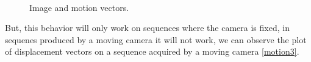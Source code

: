 \documentclass[12pt, a4paper, titlepage,twoside,openright]{article}
\begin{document}
\begin{figure}[H]
		
\centering

\\
\caption{Image and motion vectors.}
\label{motion2}
\end{figure}

But, this behavior will only work on sequences where the camera is fixed, in sequenes produced by a moving camera it will not work, we can observe the plot of displacement vectors on a sequence acquired by a moving camera \ref{motion3}. 
\end{document}
